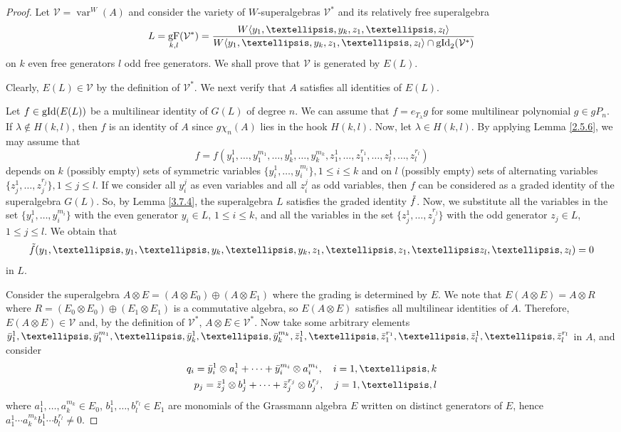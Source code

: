 \documentclass[10pt,a4paper]{amsart}
\DeclareMathOperator{\F}{gF}
\DeclareMathOperator{\gid}{\textnormal{gId}}
\DeclareMathOperator{\var}{var}
\newcommand{\cV}{\mathcal{V}}
\begin{document}
\begin{proof}
    Let $\cV=\var^W(A)$ and consider the variety of $W$-superalgebras $\mathcal{V}^*$ and its relatively free superalgebra 
    \[ L = \F_{k,l}(\cV^*)=\frac{W\langle y_1,\dots,y_k,z_1,\dots,z_l\rangle}{W\langle y_1,\dots,y_k,z_1,\dots,z_l\rangle\cap \gid_2(\cV^*)} \]
    on $k$ even free generators $l$ odd free generators. We shall prove that $\mathcal{V}$ is generated by $E(L)$.

    Clearly, $E(L) \in \mathcal{V}$ by the definition of $\mathcal{V}^*$. We next verify that $A$ satisfies all identities of $E(L)$.

    Let $f \in \gid(E(L))$ be a multilinear identity of $G(L)$ of degree $n$. We can assume that $f=e_{T_\lambda}g$ for some multilinear polynomial $g\in gP_n$. If $\lambda \notin H(k,l)$, then $f$ is an identity of $A$ since $g\chi_n(A)$ lies in the hook $H(k,l)$. Now, let $\lambda \in H(k,l)$. By applying Lemma \ref{2.5.6}, we may assume that
    \[
    f=f(y_1^1,\ldots,y_1^{m_1},\ldots,y_k^1,\ldots,y_k^{m_k},z_1^1,\ldots,z_1^{r_1},\ldots,z_l^1,\ldots,z_l^{r_l})
    \]
    depends on $k$ (possibly empty) sets of symmetric variables $\{ y_i^1,\ldots,y_i^{m_i} \}, 1 \le i \le k$ and on $l$ (possibly empty) sets of alternating variables $\{z_j^1,\ldots,z_j^{r_j}\}, 1 \le j \le l$. If we consider all $y_i^j$ as even variables and all $z_i^j$ as odd variables, then $f$ can be considered as a graded identity of the superalgebra $G(L)$. So, by Lemma \ref{3.7.4}, the superalgebra $L$ satisfies the graded identity $\Tilde{f}$. Now, we substitute all the variables in the set $\{ y_i^1,\ldots,y_i^{m_i} \}$ with the even generator $y_i\in L$, $1 \le i \le k$, and all the variables in the set $\{z_j^1,\ldots,z_j^{r_j}\}$ with the odd generator $z_j\in L$, $1 \le j \le l$. We obtain that \begin{equation} \label{eq: f=0 in L}
        \Tilde{f}(y_1,\ldots,y_1,\ldots,y_k,\ldots,y_k,z_1,\ldots,z_1,\ldots z_l,\ldots, z_l) = 0
    \end{equation}
    in $L$.

    Consider the superalgebra $A\otimes E = (A\otimes E_0) \oplus (A\otimes E_1)$ where the grading is determined by $E$. We note that $E(A\otimes E)= A\otimes R$ where $R=(E_0\otimes E_0) \oplus (E_1 \otimes E_1)$ is a commutative algebra, so $E(A\otimes E)$ satisfies all multilinear identities of $A$. Therefore, $E(A\otimes E)\in \cV$ and, by the definition of $\cV^*$, $A\otimes E\in \cV^*$. Now take some arbitrary elements $\Bar{y}_1^1,\ldots,\Bar{y}_1^{m_1}, \ldots,\Bar{y}_k^1,\ldots,\Bar{y}_k^{m_k}, \Bar{z}_1^1,\ldots,\Bar{z}_1^{r_1}, \ldots, \Bar{z}_l^1,\ldots,\Bar{z}_l^{r_l}$ in $A$, and consider 
    \begin{align*}
        q_i=\Bar{y}_i^1 \otimes a_i^1+\cdots+\Bar{y}_i^{m_i}\otimes a_i^{m_i}, \quad i=1,\ldots,k\\
        p_j=\Bar{z}_j^1\otimes b_j^1+\cdots+\Bar{z}_j^{r_j} \otimes b_j^{r_j}, \quad j=1,\ldots,l
    \end{align*}
    where $a_1^1,\ldots,a_k^{m_k} \in E_0$, $b_1^1,\ldots,b_l^{r_l}\in E_1$ are monomials of the Grassmann algebra $E$ written on distinct generators of $E$, hence $a_1^1\cdots a_k^{m_k}b_1^1\cdots b_l^{r_l} \neq 0$.


\end{proof}
\end{document}
